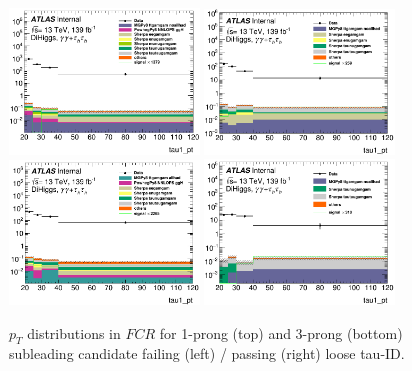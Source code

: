 \begin{figure}
	\centering
	\includegraphics[width=0.45\textwidth]{figures/yy2tau/tau1_pt_CRfail_2taus_invertGam1_1p.png}
	\includegraphics[width=0.45\textwidth]{figures/yy2tau/tau1_pt_CRpass_2taus_invertGam1_1p.png}
	\\
	\centering
	\includegraphics[width=0.45\textwidth]{figures/yy2tau/tau1_pt_CRfail_2taus_invertGam1_3p.png}
	\includegraphics[width=0.45\textwidth]{figures/yy2tau/tau1_pt_CRpass_2taus_invertGam1_3p.png}\\
	\caption{\label{fig:yy2tau:FCRs} $p_{T}$ distributions in $FCR$ for 1-prong (top) and 3-prong (bottom) subleading \tauh candidate failing (left) / passing (right) loose tau-ID.}
\end{figure}

